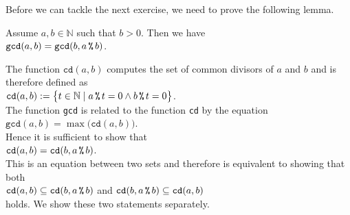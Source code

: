Before we can tackle the next exercise, we need to prove the following lemma.
\begin{Lemma}[Euclid]
  Assume $a, b \in \mathbb{N}$ such that $b > 0$.  Then we have
  \\[0.2cm]
  \hspace*{1.3cm}
  $\mathtt{gcd}(a, b) = \mathtt{gcd}(b, a \,\texttt{\%}\, b)$.
\end{Lemma}

\proof
The function $\mathtt{cd}(a, b)$ computes the set of common divisors of $a$ and $b$ and is therefore defined as
\\[0.2cm]
\hspace*{1.3cm}
 $\mathtt{cd}(a, b) := \bigl\{ t \in \mathbb{N} \mid a \,\texttt{\%}\, t = 0 \wedge b \,\texttt{\%}\, t = 0 \bigr\}$.
 \\[0.2cm]
The function \texttt{gcd} is related to the function \texttt{cd} by the equation
\\[0.2cm]
\hspace*{1.3cm}
$\mathtt{gcd}(a, b) = \max\bigl(\mathtt{cd}(a, b)\bigr)$.
\\[0.2cm]
Hence it is sufficient to show that
\\[0.2cm]
\hspace*{1.3cm}
  $\mathtt{cd}(a, b) = \mathtt{cd}(b, a \,\texttt{\%}\, b)$.
\\[0.2cm]
This is an equation between two sets and therefore is equivalent to showing that both
\\[0.2cm]
\hspace*{1.3cm}
  $\mathtt{cd}(a, b) \subseteq \mathtt{cd}(b, a \,\texttt{\%}\, b)$ \quad and \quad $\mathtt{cd}(b, a \,\texttt{\%}\, b) \subseteq \mathtt{cd}(a, b)$
\\[0.2cm]
holds.  We show these two statements separately.
